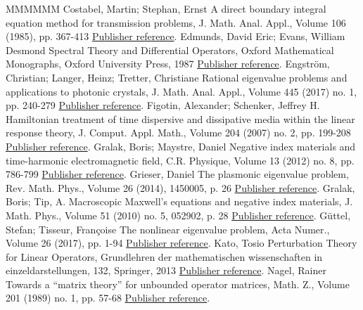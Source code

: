 \documentclass[11pt]{article}
\theoremstyle{definition}
\numberwithin{equation}{section}
\numberwithin{figure}{section}
\numberwithin{table}{section}
\begin{document}
\begin{thebibliography}{MMMMMM}
 Costabel, Martin; Stephan, Ernst A direct boundary integral equation method for transmission problems, J. Math. Anal. Appl., Volume 106 (1985), pp. 367-413 \href{https://ahl.centre-mersenne.org/item/AHL_2020__3__1161_0/#Cos-Ste-85}{Publisher reference}.
 Edmunds, David Eric; Evans, William Desmond Spectral Theory and Differential Operators, Oxford Mathematical Monographs, Oxford University Press, 1987 \href{https://ahl.centre-mersenne.org/item/AHL_2020__3__1161_0/#Edm-Eva-87}{Publisher reference}.
 Engström, Christian; Langer, Heinz; Tretter, Christiane Rational eigenvalue problems and applications to photonic crystals, J. Math. Anal. Appl., Volume 445 (2017) no. 1, pp. 240-279 \href{https://ahl.centre-mersenne.org/item/AHL_2020__3__1161_0/#Eng-Lan-Tre-17}{Publisher reference}.
 Figotin, Alexander; Schenker, Jeffrey H. Hamiltonian treatment of time dispersive and dissipative media within the linear response theory, J. Comput. Appl. Math., Volume 204 (2007) no. 2, pp. 199-208 \href{https://ahl.centre-mersenne.org/item/AHL_2020__3__1161_0/#Fig-Sch-07}{Publisher reference}.
 Gralak, Boris; Maystre, Daniel Negative index materials and time-harmonic electromagnetic field, C.R. Physique, Volume 13 (2012) no. 8, pp. 786-799 \href{https://ahl.centre-mersenne.org/item/AHL_2020__3__1161_0/#Gra-May-12}{Publisher reference}.
 Grieser, Daniel The plasmonic eigenvalue problem, Rev. Math. Phys., Volume 26 (2014), 1450005, p. 26 \href{https://ahl.centre-mersenne.org/item/AHL_2020__3__1161_0/#Gri-14}{Publisher reference}.
 Gralak, Boris; Tip, A. Macroscopic Maxwell’s equations and negative index materials, J. Math. Phys., Volume 51 (2010) no. 5, 052902, p. 28 \href{https://ahl.centre-mersenne.org/item/AHL_2020__3__1161_0/#Gra-Tip-10}{Publisher reference}.
 Güttel, Stefan; Tisseur, Françoise The nonlinear eigenvalue problem, Acta Numer., Volume 26 (2017), pp. 1-94 \href{https://ahl.centre-mersenne.org/item/AHL_2020__3__1161_0/#Gut-Tis-17}{Publisher reference}.
 Kato, Tosio Perturbation Theory for Linear Operators, Grundlehren der mathematischen wissenschaften in einzeldarstellungen, 132, Springer, 2013 \href{https://ahl.centre-mersenne.org/item/AHL_2020__3__1161_0/#Kato-84}{Publisher reference}.
 Nagel, Rainer Towards a “matrix theory” for unbounded operator matrices, Math. Z., Volume 201 (1989) no. 1, pp. 57-68 \href{https://ahl.centre-mersenne.org/item/AHL_2020__3__1161_0/#Nag-89}{Publisher reference}.

\end{thebibliography}
\end{document}
